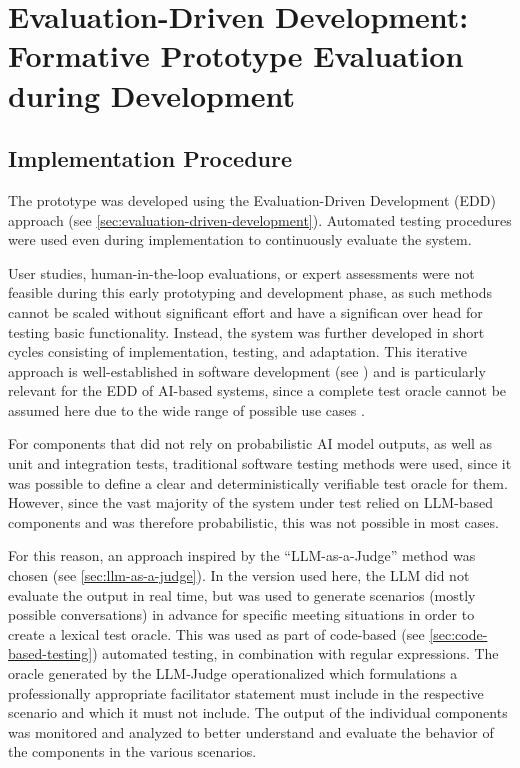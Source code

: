 \section{Evaluation-Driven Development: Formative Prototype Evaluation during Development}

\subsection{Implementation Procedure}
\label{sec:evaluation-driven-development}

The prototype was developed using the Evaluation-Driven Development (EDD) approach (see
\autoref{sec:evaluation-driven-development}). Automated testing procedures were used even during
implementation to continuously evaluate the system.

User studies, human-in-the-loop evaluations, or expert assessments were not feasible during this early
prototyping and development phase, as such methods cannot be scaled without significant effort and have a
significan over head for testing basic functionality.
Instead, the system was further developed in short cycles consisting of implementation, testing, and adaptation.
This iterative approach is well-established in software development (see
\cite[p.~8]{ottAppsEffektivManagen2019}) and is particularly relevant for the EDD of AI-based systems, since
a complete test oracle cannot be assumed here due to the wide range of possible use cases
\cite[p.~39]{istqbrISTQBCertifiedTester}.

For components that did not rely on probabilistic AI model outputs, as well as unit and integration tests,
traditional software testing methods were used, since it was possible to define a clear and deterministically
verifiable test oracle for them. However, since the vast majority of the system under test relied on
LLM-based components and was therefore probabilistic, this was not possible in most cases.

For this reason, an approach inspired by the “LLM-as-a-Judge” method was chosen (see
\autoref{sec:llm-as-a-judge}). In the version used here, the LLM did not evaluate the output in
real time, but was used to generate scenarios (mostly possible conversations) in advance for specific meeting
situations in order to create a lexical test oracle. This was used as part of code-based (see
\autoref{sec:code-based-testing}) automated testing, in combination with regular expressions.
The oracle generated by the LLM-Judge operationalized which formulations a professionally appropriate
facilitator statement must include in the respective scenario and which it must not include. The output of
the individual components was monitored and analyzed to better understand and evaluate the behavior of the
components in the various scenarios.

